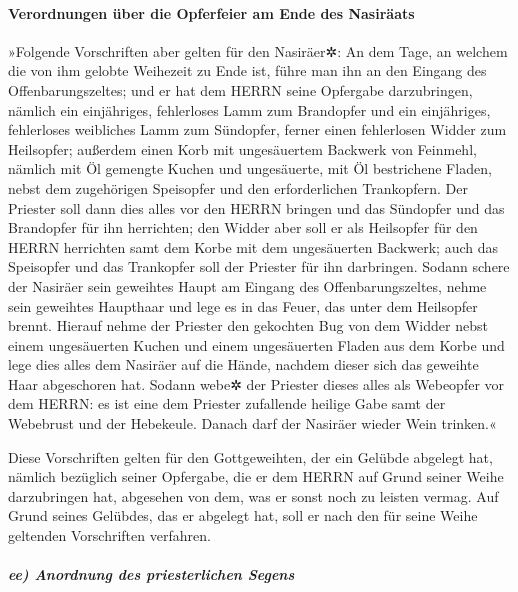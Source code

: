 \hypertarget{verordnungen-uxfcber-die-opferfeier-am-ende-des-nasiruxe4ats}{%
\paragraph{Verordnungen über die Opferfeier am Ende des
Nasiräats}\label{verordnungen-uxfcber-die-opferfeier-am-ende-des-nasiruxe4ats}}

»Folgende Vorschriften aber gelten für den Nasiräer✲: An
dem Tage, an welchem die von ihm gelobte Weihezeit zu Ende ist, führe
man ihn an den Eingang des Offenbarungszeltes; und er hat
dem HERRN seine Opfergabe darzubringen, nämlich ein einjähriges,
fehlerloses Lamm zum Brandopfer und ein einjähriges, fehlerloses
weibliches Lamm zum Sündopfer, ferner einen fehlerlosen Widder zum
Heilsopfer; außerdem einen Korb mit ungesäuertem Backwerk
von Feinmehl, nämlich mit Öl gemengte Kuchen und ungesäuerte, mit Öl
bestrichene Fladen, nebst dem zugehörigen Speisopfer und den
erforderlichen Trankopfern. Der Priester soll dann dies
alles vor den HERRN bringen und das Sündopfer und das Brandopfer für ihn
herrichten; den Widder aber soll er als Heilsopfer für
den HERRN herrichten samt dem Korbe mit dem ungesäuerten Backwerk; auch
das Speisopfer und das Trankopfer soll der Priester für ihn darbringen.
Sodann schere der Nasiräer sein geweihtes Haupt am
Eingang des Offenbarungszeltes, nehme sein geweihtes Haupthaar und lege
es in das Feuer, das unter dem Heilsopfer brennt. Hierauf
nehme der Priester den gekochten Bug von dem Widder nebst einem
ungesäuerten Kuchen und einem ungesäuerten Fladen aus dem Korbe und lege
dies alles dem Nasiräer auf die Hände, nachdem dieser sich das geweihte
Haar abgeschoren hat. Sodann webe✲ der Priester dieses
alles als Webeopfer vor dem HERRN: es ist eine dem Priester zufallende
heilige Gabe samt der Webebrust und der Hebekeule. Danach darf der
Nasiräer wieder Wein trinken.«

Diese Vorschriften gelten für den Gottgeweihten, der ein
Gelübde abgelegt hat, nämlich bezüglich seiner Opfergabe, die er dem
HERRN auf Grund seiner Weihe darzubringen hat, abgesehen von dem, was er
sonst noch zu leisten vermag. Auf Grund seines Gelübdes, das er abgelegt
hat, soll er nach den für seine Weihe geltenden Vorschriften verfahren.

\hypertarget{ee-anordnung-des-priesterlichen-segens}{%
\subparagraph{ee) Anordnung des priesterlichen
Segens}\label{ee-anordnung-des-priesterlichen-segens}}

